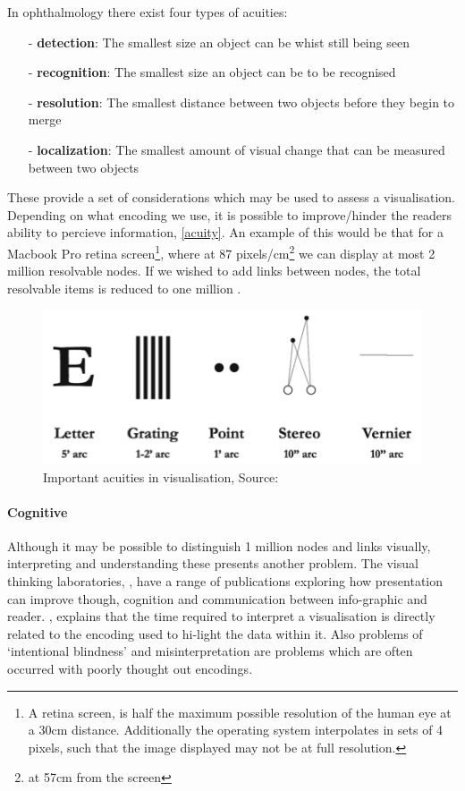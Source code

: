  In ophthalmology there exist four types of  acuities: 
\begin{itemize}
\item[-] \textbf{detection}: The smallest size an object can be whist still being seen
\item[-] \textbf{recognition}: The smallest size an object can be to be recognised
\item[-] \textbf{resolution}: The smallest distance between two objects before they begin to merge
\item[-] \textbf{localization}: The smallest amount of visual change that can be measured between two objects
\end{itemize}

These provide a set of considerations which may be used to assess a visualisation. Depending on what encoding we use, it is possible to improve/hinder the readers ability to percieve information, \autoref{acuity}. An example of this would be that for a Macbook Pro retina screen\footnote{A retina screen, is half the maximum possible resolution of the human eye at a 30cm distance. Additionally the operating system interpolates in sets of 4 pixels, such that the image displayed may not be at full resolution.}, where at 87 pixels/cm\footnote{at 57cm from the screen} we can display at most 2 million resolvable nodes. If we wished to add links between nodes, the total resolvable items is reduced to one million
\cite{ch10}. 

\begin{figure}[H]
\begin{center}
\includegraphics[scale=.6]{figures_c1/acuity.png}
\end{center}
\caption{Important acuities in visualisation, Source: \cite{ch10,ware}}\label{acuity}
\end{figure}


\paragraph*{Cognitive}
Although it may be possible to distinguish 1 million nodes and links visually, interpreting and understanding these presents another problem. The visual thinking laboratories, \cite{vt}, have a range of publications exploring how presentation can improve though, cognition and communication between info-graphic and reader. \cite{OpenVis}, explains that the time required to interpret a visualisation is directly related to the encoding used to hi-light the data within it. Also problems of `intentional blindness' and misinterpretation are problems which are often occurred with poorly thought out encodings.  

